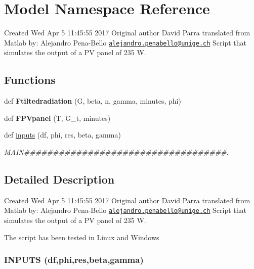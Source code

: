 \hypertarget{namespace_model}{}\section{Model Namespace Reference}
\label{namespace_model}


Created Wed Apr 5 11\+:45\+:55 2017 Original author David Parra translated from Matlab by\+: Alejandro Pena-\/\+Bello \href{mailto:alejandro.penabello@unige.ch}{\tt alejandro.\+penabello@unige.\+ch} Script that simulates the output of a PV panel of 235 W.  


\subsection*{Functions}
\begin{DoxyCompactItemize}
\item 
\mbox{\label{namespace_model_a63d96c98ca59940fe7b2f1bb6d806740}} 
def {\bfseries Ftiltedradiation} (G, beta, n, gamma, minutes, phi)
\item 
\mbox{\label{namespace_model_a2972cae42905b8cef597674ffbef1d0b}} 
def {\bfseries F\+P\+Vpanel} (T, G\+\_\+t, minutes)
\item 
\mbox{\label{namespace_model_a63225e8607ee768b45c172b4e55c6e42}} 
def \mbox{\hyperlink{namespace_model_a63225e8607ee768b45c172b4e55c6e42}{inputs}} (df, phi, res, beta, gamma)
\begin{DoxyCompactList}\small\item\em M\+A\+IN\#\#\#\#\#\#\#\#\#\#\#\#\#\#\#\#\#\#\#\#\#\#\#\#\#\#\#\#\#\#\#\#\#\#\#. \end{DoxyCompactList}\end{DoxyCompactItemize}


\subsection{Detailed Description}
Created Wed Apr 5 11\+:45\+:55 2017 Original author David Parra translated from Matlab by\+: Alejandro Pena-\/\+Bello \href{mailto:alejandro.penabello@unige.ch}{\tt alejandro.\+penabello@unige.\+ch} Script that simulates the output of a PV panel of 235 W. 

The script has been tested in Linux and Windows \subsubsection*{I\+N\+P\+U\+TS (df,phi,res,beta,gamma) }

